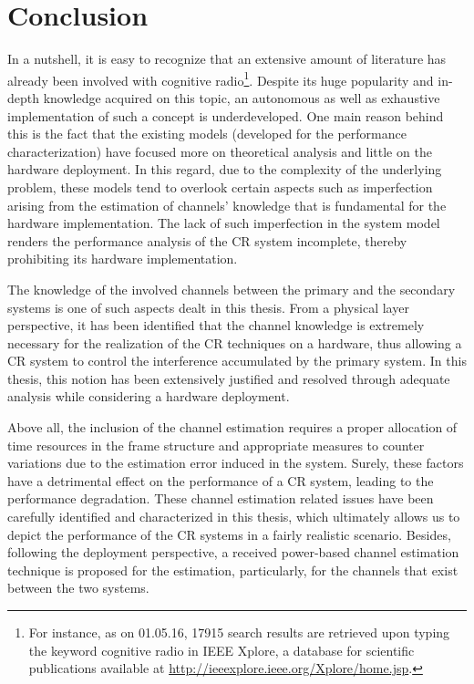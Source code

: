 \chapter{Conclusion}
\label{chap:Con}

In a nutshell, it is easy to recognize that an extensive amount of literature has already been involved with cognitive radio\footnote{For instance, as on 01.05.16, 17915 search results are retrieved upon typing the keyword cognitive radio in IEEE Xplore, a database for scientific publications available at \url{http://ieeexplore.ieee.org/Xplore/home.jsp}.}. Despite its huge popularity and in-depth knowledge acquired on this topic, an autonomous as well as exhaustive implementation of such a concept is underdeveloped. One main reason behind this is the fact that the existing models (developed for the performance characterization) have focused more on theoretical analysis and little on the hardware deployment. In this regard, due to the complexity of the underlying problem, these models tend to overlook certain aspects such as imperfection arising from the estimation of channels' knowledge that is fundamental for the hardware implementation. The lack of such imperfection in the system model renders the performance analysis of the CR system incomplete, thereby prohibiting its hardware implementation. 

The knowledge of the involved channels between the primary and the secondary systems is one of such aspects dealt in this thesis. 
From a physical layer perspective, it has been identified that the channel knowledge is extremely necessary for the realization of the CR techniques on a hardware, thus allowing a CR system to control the interference accumulated by the primary system. In this thesis, this notion has been extensively justified and resolved through adequate analysis while considering a hardware deployment. %

Above all, the inclusion of the channel estimation requires a proper allocation of time resources in the frame structure and appropriate measures to counter variations due to the estimation error induced in the system. Surely, these factors have a detrimental effect on the performance of a CR system, leading to the performance degradation. These channel estimation related issues have been carefully identified and characterized in this thesis, which ultimately allows us to depict the performance of the CR systems in a fairly realistic scenario. Besides, following the deployment perspective, a received power-based channel estimation technique is proposed for the estimation, particularly, for the channels that exist between the two systems. 


